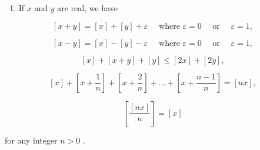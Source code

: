 \BourbakiExerciseGroup

\begin{enumerate}
\def\labelenumi{\arabic{enumi})}
\tightlist
\item
  If \(x\) and \(y\) are real, we have
\end{enumerate}

\[
[ x + y ] = [ x ] + [ y ] + \varepsilon \quad \text { where } \varepsilon = 0 \quad \text { or } \quad \varepsilon = 1,
\]

\[
[ x - y ] = [ x ] - [ y ] - \varepsilon \quad \text { where } \varepsilon = 0 \quad \text { or } \quad \varepsilon = 1,
\]

\[
[ x ] + [ x + y ] + [ y ] \leqslant [ 2 x ] + [ 2 y ],
\]

\[
[ x ] + \left[ x + \frac {1}{n} \right] + \left[ x + \frac {2}{n} \right] + \dots + \left[ x + \frac {n - 1}{n} \right] = [ n x ],
\]

\[
\left[ \frac {[ n x ]}{n} \right] = [ x ]
\]

for any integer \(n > 0\) .

